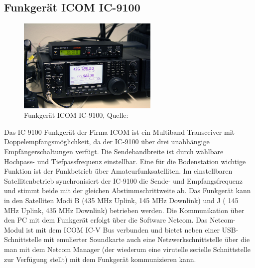 \subsection{Funkgerät ICOM IC-9100}
\begin{figure}[h]
	\centering
	\includegraphics[width=0.6\textwidth]{images/radio}
	\caption{Funkgerät ICOM IC-9100, Quelle: \cite{dk0te}}
	\label{fig:radio}
\end{figure}
Das IC-9100 Funkgerät der Firma ICOM ist ein Multiband Transceiver mit Doppelempfangsmöglichkeit, da der IC-9100 über drei unabhängige 
Empfängerschaltungen verfügt. Die Sendebandbreite ist durch wählbare Hochpass- und Tiefpassfrequenz einstellbar. Eine für die Bodenstation wichtige 
Funktion ist der Funkbetrieb über Amateurfunksatelliten. Im einstellbaren Satellitenbetrieb synchronisiert der IC-9100 die Sende-  und 
Empfangsfrequenz und stimmt beide mit der gleichen Abstimmschrittweite ab. Das Funkgerät kann in den Satelliten Modi B (435 MHz Uplink, 145 MHz 
Downlink) und J ( 145 MHz Uplink, 435 MHz Downlink) betrieben werden. Die Kommunikation über den PC mit dem Funkgerät erfolgt über die Software 
Netcom.  Das Netcom-Modul ist mit dem ICOM IC-V Bus verbunden und bietet neben einer USB-Schnittstelle mit emulierter 
Soundkarte auch eine Netzwerkschnittstelle über die man mit dem Netcom Manager (der wiederum eine virutelle serielle Schnittstelle zur Verfügung 
stellt) mit dem Funkgerät kommunizieren kann.





